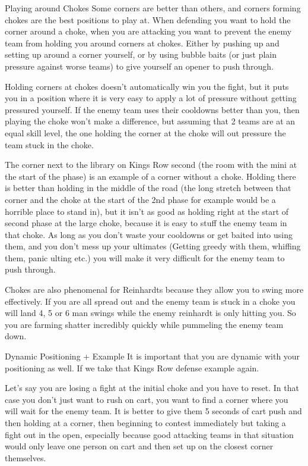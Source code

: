 Playing around Chokes
Some corners are better than others, and corners forming chokes are the best positions to play at. When defending you want to hold the corner around a choke, when you are attacking you want to prevent the enemy team from holding you around corners at chokes. Either by pushing up and setting up around a corner yourself, or by using bubble baits (or just plain pressure against worse teams) to give yourself an opener to push through.

Holding corners at chokes doesn’t automatically win you the fight, but it puts you in a position where it is very easy to apply a lot of pressure without getting pressured yourself. If the enemy team uses their cooldowns better than you, then playing the choke won’t make a difference, but assuming that 2 teams are at an equal skill level, the one holding the corner at the choke will out pressure the team stuck in the choke.

The corner next to the library on Kings Row second (the room with the mini at the start of the phase) is an example of a corner without a choke. Holding there is better than holding in the middle of the road (the long stretch between that corner and the choke at the start of the 2nd phase for example would be a horrible place to stand in), but it isn’t as good as holding right at the start of second phase at the large choke, because it is easy to stuff the enemy team in that choke.
As long as you don’t waste your cooldowns or get baited into using them, and you don’t mess up your ultimates (Getting greedy with them, whiffing them, panic ulting etc.) you will make it very difficult for the enemy team to push through.

Chokes are also phenomenal for Reinhardts because they allow you to swing more effectively. If you are all spread out and the enemy team is stuck in a choke you will land 4, 5 or 6 man swings while the enemy reinhardt is only hitting you. So you are farming shatter incredibly quickly while pummeling the enemy team down.

Dynamic Positioning + Example
It is important that you are dynamic with your positioning as well. If we take that Kings Row defense example again.

Let’s say you are losing a fight at the initial choke and you have to reset. In that case you don’t just want to rush on cart, you want to find a corner where you will wait for the enemy team. It is better to give them 5 seconds of cart push and then holding at a corner, then beginning to contest immediately but taking a fight out in the open, especially because good attacking teams in that situation would only leave one person on cart and then set up on the closest corner themselves.

